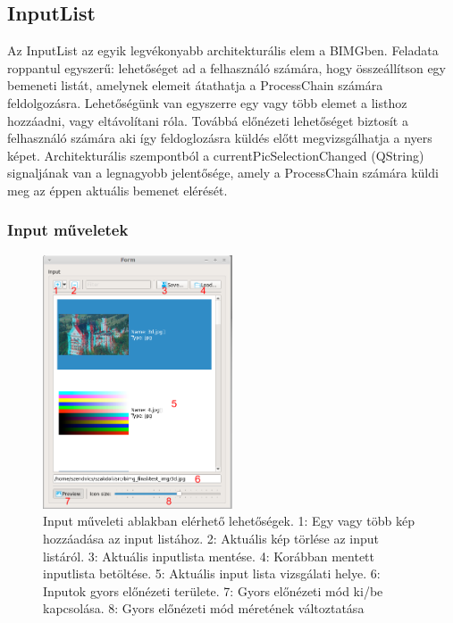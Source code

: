 \documentclass[a4paper,12pt,oneside]{report}
\begin{document}
\subsection{InputList}
Az InputList az egyik legvékonyabb architekturális elem a BIMGben. Feladata roppantul egyszerű: lehetőséget ad a felhasználó számára, hogy összeállítson egy bemeneti listát, amelynek elemeit átathatja a ProcessChain számára feldolgozásra. Lehetőségünk van egyszerre egy vagy több elemet a listhoz hozzáadni, vagy eltávolítani róla. Továbbá előnézeti lehetőséget biztosít a felhasználó számára aki így feldoglozásra küldés előtt megvizsgálhatja a nyers képet. Architekturális szempontból a currentPicSelectionChanged (QString) signaljának van a legnagyobb jelentősége, amely a ProcessChain számára küldi meg az éppen aktuális bemenet elérését.

\subsubsection{Input műveletek}
\begin{center}
\begin{figure}[h]
  \includegraphics[width=0.5\textwidth]{user/fileeditor.png}
  \caption{Input műveleti ablakban elérhető lehetőségek. 1: Egy vagy több kép hozzáadása az input listához. 2: Aktuális kép törlése az input listáról. 3: Aktuális inputlista mentése. 4: Korábban mentett inputlista betöltése. 5: Aktuális input lista vizsgálati helye. 6: Inputok gyors előnézeti területe. 7: Gyors előnézeti mód ki/be kapcsolása. 8: Gyors előnézeti mód méretének változtatása  }

  \label{fig:bimg_filelistdialog}
\end{figure}
\end{center}
\end{document}
